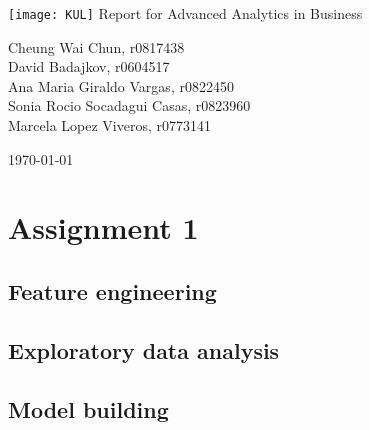\documentclass[12pt]{article}
\begin{document}
\begin{titlepage}
	\begin{center}
	\vspace*{1cm}
    \texttt{[image: KUL]}
	\vspace{2.5cm}
    {\Large Report for Advanced Analytics in Business}
            
    \vspace{1.5cm}

    {\large Cheung Wai Chun, r0817438}\\
    \vspace{0.5cm}
    {\large David Badajkov, r0604517}\\
    \vspace{0.5cm}
    {\large Ana Maria Giraldo Vargas, r0822450}\\
    \vspace{0.5cm}
	{\large Sonia Rocio 	Socadagui Casas, r0823960}\\
	\vspace{0.5cm}
	{\large Marcela 	Lopez Viveros, r0773141}
	\vspace{1.5cm}

       \today
   \end{center}
\end{titlepage}

\newpage
\tableofcontents
\newpage

\section*{Assignment 1}

\subsection*{Feature engineering}

\subsection*{Exploratory data analysis}

\subsection*{Model building}
\end{document}
